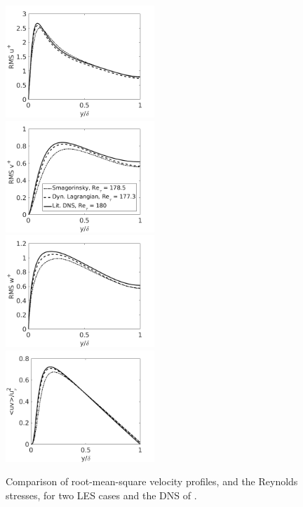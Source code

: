 \documentclass[12pt,oneside,a4paper]{article}
\begin{document}
\begin{figure}[!b]
\centering
\includegraphics[width=0.5\textwidth]{images/rms_u.png}\hfill
\includegraphics[width=0.5\textwidth]{images/rms_v.png}\\
\includegraphics[width=0.5\textwidth]{images/rms_w.png}\hfill
\includegraphics[width=0.5\textwidth]{images/Reynolds_Stress.png}
\caption{Comparison of root-mean-square velocity profiles, and the Reynolds stresses, for two LES cases and the DNS of \cite{vreman2014}.}
\label{figure:rmsVelocityProfiles}
\end{figure}
\end{document}
